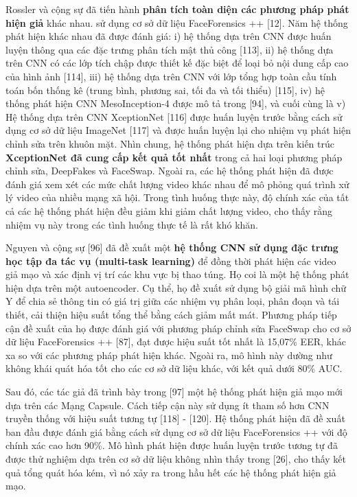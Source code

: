 \documentclass{article}
\begin{document}
Rossler và cộng sự đã tiến hành \textbf{phân tích toàn diện các phương pháp phát hiện giả} khác nhau. sử dụng cơ sở dữ liệu FaceForensics ++ [12]. Năm hệ thống phát hiện khác nhau đã được đánh giá: i) hệ thống dựa trên CNN được huấn luyện thông qua các đặc trưng phân tích mật thủ công [113], ii) hệ thống dựa trên CNN có các lớp tích chập được thiết kế đặc biệt để loại bỏ nội dung cấp cao của hình ảnh [114], iii) hệ thống dựa trên CNN với lớp tổng hợp toàn cầu tính toán bốn thống kê (trung bình, phương sai, tối đa và tối thiểu) [115], iv) hệ thống phát hiện CNN MesoInception-4 được mô tả trong [94], và cuối cùng là v) Hệ thống dựa trên CNN XceptionNet [116] được huấn luyện trước bằng cách sử dụng cơ sở dữ liệu ImageNet [117] và được huấn luyện lại cho nhiệm vụ phát hiện chỉnh sửa trên khuôn mặt. Nhìn chung, hệ thống phát hiện dựa trên kiến trúc\textbf{ XceptionNet đã cung cấp kết quả tốt nhất} trong cả hai loại phương pháp chỉnh sửa, DeepFakes và FaceSwap. Ngoài ra, các hệ thống phát hiện đã được đánh giá xem xét các mức chất lượng video khác nhau để mô phỏng quá trình xử lý video của nhiều mạng xã hội. Trong tình huống thực này, độ chính xác của tất cả các hệ thống phát hiện đều giảm khi giảm chất lượng video, cho thấy rằng nhiệm vụ này trong các tình huống thực tế là rất khó khăn.

Nguyen và cộng sự [96] đã đề xuất một \textbf{hệ thống CNN sử dụng đặc trưng học tập đa tác vụ (multi-task learning)} để đồng thời phát hiện các video giả mạo và xác định vị trí các khu vực bị thao túng. Họ coi là một hệ thống phát hiện dựa trên một autoencoder. Cụ thể, họ đề xuất sử dụng bộ giải mã hình chữ Y để chia sẻ thông tin có giá trị giữa các nhiệm vụ phân loại, phân đoạn và tái thiết, cải thiện hiệu suất tổng thể bằng cách giảm mất mát. Phương pháp tiếp cận đề xuất của họ được đánh giá với phương pháp chỉnh sửa FaceSwap cho cơ sở dữ liệu FaceForensics ++ [87], đạt được hiệu suất tốt nhất là 15,07\% EER, khác xa so với các phương pháp phát hiện khác. Ngoài ra, mô hình này dường như không khái quát hóa tốt cho các cơ sở dữ liệu khác, với kết quả dưới 80\% AUC.

Sau đó, các tác giả đã trình bày trong [97] một hệ thống phát hiện giả mạo mới dựa trên các Mạng Capsule. Cách tiếp cận này sử dụng ít tham số hơn CNN truyền thống với hiệu suất tương tự [118] - [120]. Hệ thống phát hiện đã đề xuất ban đầu được đánh giá bằng cách sử dụng cơ sở dữ liệu FaceForensics ++ với độ chính xác cao hơn 90\%. Mô hình phát hiện được huấn luyện trước tương tự đã được thử nghiệm dựa trên cơ sở dữ liệu không nhìn thấy trong [26], cho thấy kết quả tổng quát hóa kém, vì nó xảy ra trong hầu hết các hệ thống phát hiện giả mạo.
\end{document}
